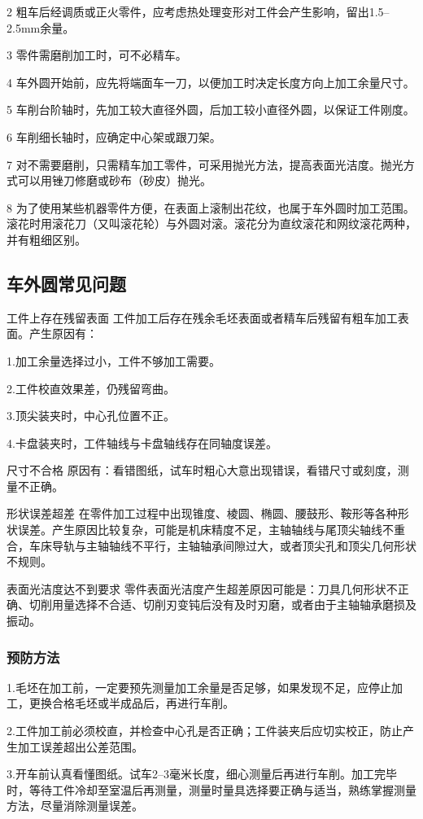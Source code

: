 \documentclass{ctexbook}
\begin{document}
2 粗车后经调质或正火零件，应考虑热处理变形对工件会产生影响，留出1.5--2.5mm余量。

3 零件需磨削加工时，可不必精车。

4 车外圆开始前，应先将端面车一刀，以便加工时决定长度方向上加工余量尺寸。

5 车削台阶轴时，先加工较大直径外圆，后加工较小直径外圆，以保证工件刚度。

6 车削细长轴时，应确定中心架或跟刀架。

7 对不需要磨削，只需精车加工零件，可采用抛光方法，提高表面光洁度。抛光方式可以用锉刀修磨或砂布（砂皮）抛光。

8 为了使用某些机器零件方便，在表面上滚制出花纹，也属于车外圆时加工范围。滚花时用滚花刀（又叫滚花轮）与外圆对滚。滚花分为直纹滚花和网纹滚花两种，并有粗细区别。
\subsection{车外圆常见问题}
工件上存在残留表面 工件加工后存在残余毛坯表面或者精车后残留有粗车加工表面。产生原因有：

1.加工余量选择过小，工件不够加工需要。

2.工件校直效果差，仍残留弯曲。

3.顶尖装夹时，中心孔位置不正。

4.卡盘装夹时，工件轴线与卡盘轴线存在同轴度误差。

尺寸不合格 原因有：看错图纸，试车时粗心大意出现错误，看错尺寸或刻度，测量不正确。

形状误差超差 在零件加工过程中出现锥度、棱圆、椭圆、腰鼓形、鞍形等各种形状误差。产生原因比较复杂，可能是机床精度不足，主轴轴线与尾顶尖轴线不重合，车床导轨与主轴轴线不平行，主轴轴承间隙过大，或者顶尖孔和顶尖几何形状不规则。

表面光洁度达不到要求 零件表面光洁度产生超差原因可能是：刀具几何形状不正确、切削用量选择不合适、切削刃变钝后没有及时刃磨，或者由于主轴轴承磨损及振动。
\subsubsection{预防方法}
1.毛坯在加工前，一定要预先测量加工余量是否足够，如果发现不足，应停止加工，更换合格毛坯或半成品后，再进行车削。

2.工件加工前必须校直，并检查中心孔是否正确；工件装夹后应切实校正，防止产生加工误差超出公差范围。

3.开车前认真看懂图纸。试车2--3毫米长度，细心测量后再进行车削。加工完毕时，等待工件冷却至室温后再测量，测量时量具选择要正确与适当，熟练掌握测量方法，尽量消除测量误差。
\end{document}
